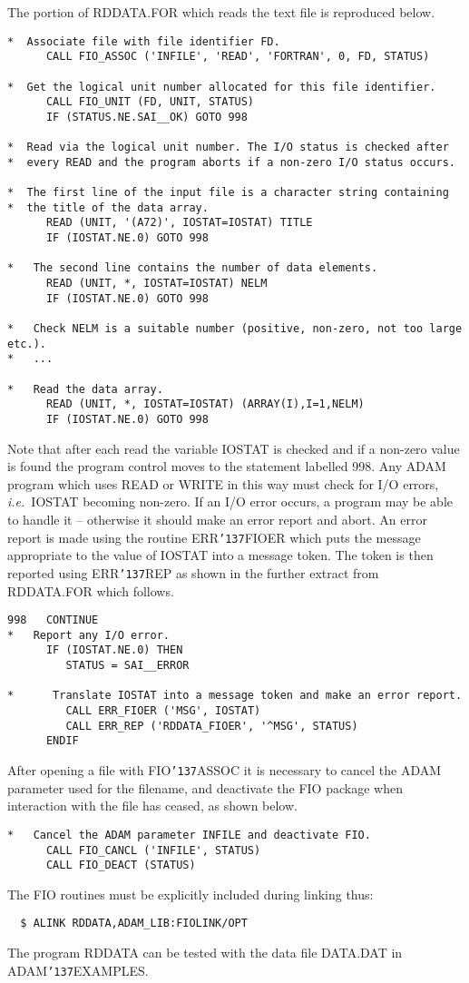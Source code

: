\documentclass[twoside,11pt]{article}
\renewcommand{\_}{{\tt\char'137}}
\begin{document}
The portion of RDDATA.FOR which reads the text file is reproduced below.
\begin{verbatim}
*  Associate file with file identifier FD.
      CALL FIO_ASSOC ('INFILE', 'READ', 'FORTRAN', 0, FD, STATUS)

*  Get the logical unit number allocated for this file identifier.
      CALL FIO_UNIT (FD, UNIT, STATUS)      
      IF (STATUS.NE.SAI__OK) GOTO 998

*  Read via the logical unit number. The I/O status is checked after
*  every READ and the program aborts if a non-zero I/O status occurs.

*  The first line of the input file is a character string containing
*  the title of the data array.
      READ (UNIT, '(A72)', IOSTAT=IOSTAT) TITLE
      IF (IOSTAT.NE.0) GOTO 998

*   The second line contains the number of data elements.
      READ (UNIT, *, IOSTAT=IOSTAT) NELM
      IF (IOSTAT.NE.0) GOTO 998

*   Check NELM is a suitable number (positive, non-zero, not too large etc.).
*   ...

*   Read the data array.
      READ (UNIT, *, IOSTAT=IOSTAT) (ARRAY(I),I=1,NELM)
      IF (IOSTAT.NE.0) GOTO 998
\end{verbatim}
Note that after each read the variable IOSTAT is checked and 
if a non-zero value is found the program control moves to the statement
labelled 998.
Any ADAM  program which uses READ or WRITE in this way must check
for I/O errors,  {\it i.e.}\ IOSTAT becoming non-zero.
If an I/O error occurs, a program  may be able to handle it --
otherwise it should make an error report and abort.
An error report is made using the routine ERR\_FIOER which puts 
the message appropriate 
to the value of IOSTAT into a message token. The token is then
reported using ERR\_REP as shown in the  further extract from RDDATA.FOR 
which follows.
\begin{verbatim}
998   CONTINUE
*   Report any I/O error.
      IF (IOSTAT.NE.0) THEN
         STATUS = SAI__ERROR

*      Translate IOSTAT into a message token and make an error report.
         CALL ERR_FIOER ('MSG', IOSTAT)
         CALL ERR_REP ('RDDATA_FIOER', '^MSG', STATUS)
      ENDIF
\end{verbatim}
After opening a file with FIO\_ASSOC it is necessary to cancel the ADAM 
parameter used for the filename, and deactivate the FIO package when 
interaction with the file 
has ceased, as shown below.
\begin{verbatim}
*   Cancel the ADAM parameter INFILE and deactivate FIO.
      CALL FIO_CANCL ('INFILE', STATUS)
      CALL FIO_DEACT (STATUS)
\end{verbatim}
The FIO routines must be explicitly included during linking thus:
\begin{verbatim}
  $ ALINK RDDATA,ADAM_LIB:FIOLINK/OPT
\end{verbatim}
The program RDDATA can be tested with the data file DATA.DAT in 
ADAM\_EXAMPLES.
\end{document}
